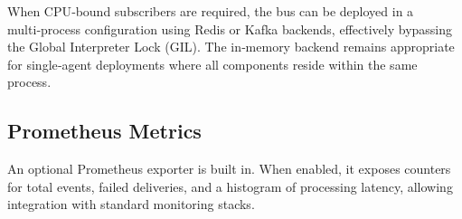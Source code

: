 When CPU‑bound subscribers are required, the bus can be deployed in a
multi‑process configuration using Redis or Kafka backends, effectively
bypassing the Global Interpreter Lock (GIL).  The in‑memory backend
remains appropriate for single‑agent deployments where all components
reside within the same process.

\subsection{Prometheus Metrics}

An optional Prometheus exporter is built in.  When enabled, it exposes
counters for total events, failed deliveries, and a histogram of
processing latency, allowing integration with standard monitoring stacks.